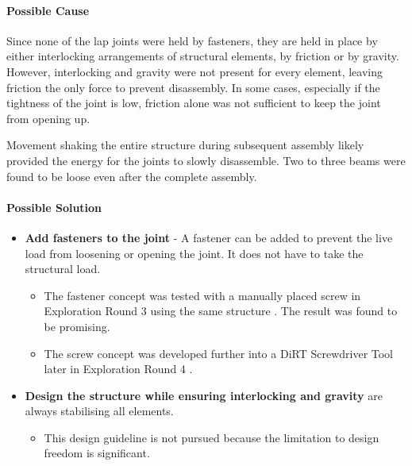 \paragraph{Possible Cause}

Since none of the lap joints were held by fasteners, they are held in place by either interlocking arrangements of structural elements, by friction or by gravity. However, interlocking and gravity were not present for every element, leaving friction the only force to prevent disassembly. In some cases, especially if the tightness of the joint is low, friction alone was not sufficient to keep the joint from opening up.

Movement shaking the entire structure during subsequent assembly likely provided the energy for the joints to slowly disassemble. Two to three beams were found to be loose even after the complete assembly. 

\paragraph{Possible Solution}
\begin{itemize}
    \item \textbf{Add fasteners to the joint} - A fastener can be added to prevent the live load from loosening or opening the joint. It does not have to take the structural load.
    \begin{itemize}
        \item The fastener concept was tested with a manually placed screw in Exploration Round 3 using the same structure . The result was found to be promising.
        \item The screw concept was developed further into a DiRT Screwdriver Tool later in Exploration Round 4 .
    \end{itemize}
    \item \textbf{Design the structure while ensuring interlocking and gravity} are always stabilising all elements. 
    \begin{itemize}
        \item This design guideline is not pursued because the limitation to design freedom is significant. 
    \end{itemize}
\end{itemize}
